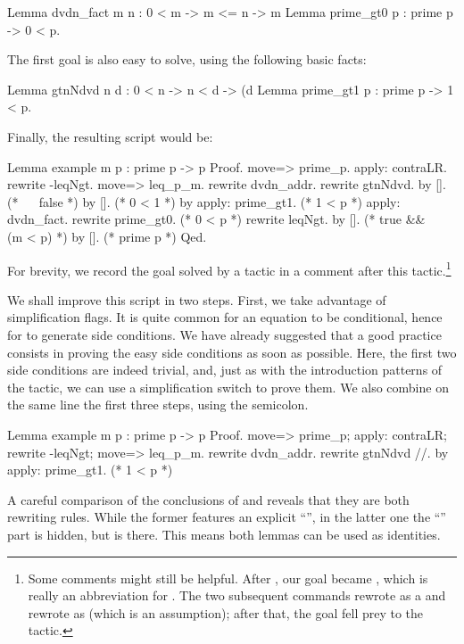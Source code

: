 \begin{coq}{}{}
Lemma dvdn_fact m n : 0 < m -> m <= n -> m %
Lemma prime_gt0 p : prime p -> 0 < p.
\end{coq}

The first goal is also easy to solve, using the following basic facts:

\begin{coq}{}{}
Lemma gtnNdvd n d : 0 < n -> n < d -> (d %
Lemma prime_gt1 p : prime p -> 1 < p.
\end{coq}
Finally, the resulting script would be:

\begin{coq}{}{}
Lemma example m p : prime p -> p %
Proof.
move=> prime_p.
apply: contraLR.
rewrite -leqNgt.
move=> leq_p_m.
rewrite dvdn_addr.
  rewrite gtnNdvd.
    by [].  (* ~~ false *)
    by [].  (* 0 < 1 *)
  by apply: prime_gt1.  (* 1 < p *)
apply: dvdn_fact.
  rewrite prime_gt0.  (* 0 < p *)
  rewrite leqNgt.
  by [].  (* true && ~~ (m < p) *)
by [].   (* prime p *)
Qed.
\end{coq}
For brevity, we record the goal solved by a tactic in a comment after
this tactic.\footnote{Some comments might still be helpful.
After , our goal became
, which is really an abbreviation for
. The two subsequent  commands
rewrote  as a  and rewrote  as
 (which is an assumption); after that, the goal fell
prey to the  tactic.}

We shall improve this script in two steps.  First, we take advantage of
 simplification flags.  It is quite common
for an equation to be conditional, hence for  to generate side
conditions.  We have already suggested that a good practice consists
in proving the easy side conditions
as soon as possible.  Here, the first two side conditions are indeed
trivial, and, just as with the introduction patterns of the  tactic,
we can use a simplification switch \C{//} to prove them.
We also combine on the same line the first three steps, using
the semicolon.

\begin{coq}{}{}
Lemma example m p : prime p -> p %
Proof.
move=> prime_p; apply: contraLR; rewrite -leqNgt; move=> leq_p_m.
rewrite dvdn_addr.
  rewrite gtnNdvd //.
  by apply: prime_gt1.  (* 1 < p *)
\end{coq}
A careful comparison of the conclusions of 
and  reveals that they are both rewriting rules.  While
the former features an explicit ``'', in the
latter one the ``'' part is hidden, but is there.
This means
both lemmas can be used as identities.

